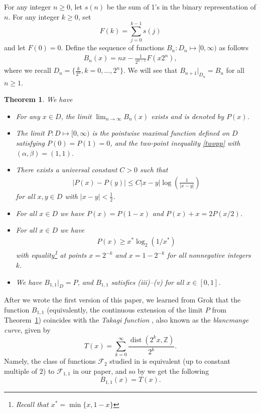 \documentclass[11pt]{amsart}
\newtheorem{theorem}{Theorem}[section]
\theoremstyle{definition}
\renewcommand{\1}{{\mathbbm{1}}}
\begin{document}
For any integer $n \geq 0$, let $s(n)$ be the sum of 1's in the binary representation of $n$.
 For any integer $k\geq0$, set 
\begin{equation}\label{eq:F_def}
F(k) = \sum_{j=0}^{k-1}s(j)
\end{equation}
and let $F(0)=0$. Define the sequence of functions $B_{n} : D_{n} \mapsto [0,\infty)$ as follows 
\begin{align}
B_n(x)    =   nx - \frac{1}{2^{n-1}} F(x2^n),\label{eq:bn}
\end{align}
where we recall $D_{n} = \{ \frac{k}{2^{n}}, k=0, \ldots, 2^{n}\}$. We will see that $B_{n+1}|_{D_{n}}=B_{n}$ for all $n\geq 1$.

\begin{theorem}\label{thm-bn}
We have 
\begin{itemize}
\item[(i)]
For any $x \in D$, the limit $\lim_{n \to \infty}B_{n}(x)$ exists and is denoted by $P(x)$. 

\item[(ii)] The limit $P: D \mapsto [0,\infty)$ is the pointwise maximal function defined on $D$ satisfying $P(0)=P(1)=0$, and the two-point inequality \eqref{twopp} with $(\alpha, \beta)=(1,1)$. 

\item[(iii)] There exists a universal constant $C>0$ such that
\begin{align*}
|P(x)-P(y)| \leq C |x-y| \log\left(\frac{1}{|x-y|}\right)
\end{align*}
for all $x,y \in D$ with $|x-y|<\frac{1}{2}$.
\item[(iv)] For all $x \in D$ we have $P(x)=P(1-x)$ and $P(x)+x = 2P(x/2)$. 
\item[(v)] For all $x \in D$ we have 
\begin{align*}
P(x) \geq x^{*} \log_{2}(1/x^{*})  
\end{align*}
with equality\footnote{Recall that $x^{*}=\min\{x, 1-x\}$} at points $x=2^{-k}$ and $x=1-2^{-k}$ for all nonnegative integers $k$.
\item[(vi)] We have $B_{1,1}|_{D}=P$, and $B_{1,1}$ satisfies \textup{(iii)}--\textup{(v)} for all $x \in [0,1]$. 
\end{itemize}
\end{theorem}


After we wrote the first version of this paper, we learned from Grok that the function $B_{1,1}$ (equivalently, the continuous extension of the  limit $P$ from Theorem~\ref{thm-bn}) coincides with the \emph{Takagi function} \cite{AllaartKawamuraTakagiSurvey,LagariasTakagiRH}, also known as the \emph{blancmange curve}, given by 
\begin{equation}\label{eq:Tagaki}
 T(x)=\sum_{k=0}^{\infty}\frac{\operatorname{dist}(2^{k}x,\mathbb{Z})}{2^{k}}. 
\end{equation}
Namely, the class of functions $\mathcal{F}_{2}$ studied in  \cite{Lev} is equivalent (up to constant multiple of $2$) to $\mathcal{F}_{1,1}$ in our paper, and so by {\cite[Theorem 7]{Lev}} we get the following 
$$ B_{1,1}(x)= T(x)%
.$$
\end{document}
